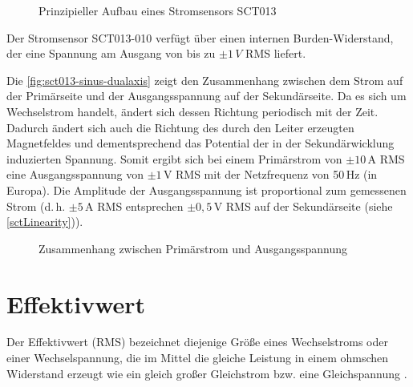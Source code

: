 	\begin{figure}[H]
		\centering
		\caption{Prinzipieller Aufbau eines Stromsensors SCT013 \cite[480]{Meier:2022}}
		\label{fig:sctPrinciple}
	\end{figure}
	
	Der Stromsensor SCT013-010 verfügt über einen internen Burden-Widerstand, der eine Spannung am Ausgang von bis zu $\pm 1\,{V}$ RMS liefert.
	
	
	Die \autoref{fig:sct013-sinus-dualaxis} zeigt den Zusammenhang zwischen dem Strom auf der Primärseite und der Ausgangsspannung auf der Sekundärseite. Da es sich um Wechselstrom handelt, ändert sich dessen Richtung periodisch mit der Zeit. Dadurch ändert sich auch die Richtung des durch den Leiter erzeugten Magnetfeldes und dementsprechend das Potential der in der Sekundärwicklung induzierten Spannung. Somit ergibt sich bei einem Primärstrom von $\pm 10\,\text{A}$ RMS eine Ausgangsspannung von $\pm 1\,\text{V}$ RMS mit der Netzfrequenz von 50\,Hz (in Europa). Die Amplitude der Ausgangsspannung ist proportional zum gemessenen Strom (d.\,h. $\pm 5\,\text{A}$ RMS entsprechen $\pm 0{,}5\,\text{V}$ RMS auf der Sekundärseite (siehe \autoref{sctLinearity})).
	
	\begin{figure}[H]
		\centering
		\caption{Zusammenhang zwischen Primärstrom und Ausgangsspannung \cite{YHDC:2017}}
		\label{fig:sct013-sinus-dualaxis}
	\end{figure}
	
\section{Effektivwert \label{sct:RMS}}
Der Effektivwert (RMS) bezeichnet diejenige Grö{\ss}e eines Wechselstroms oder einer Wechselspannung, die im Mittel die gleiche Leistung in einem ohmschen Widerstand erzeugt wie ein gleich gro{\ss}er Gleichstrom bzw. eine Gleichspannung \cite[255]{Stiny:2024}. 


